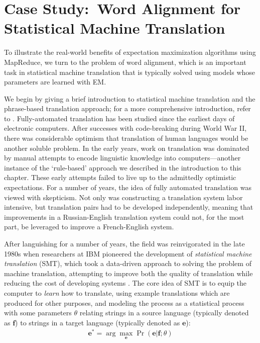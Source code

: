 \section{Case Study:\ Word Alignment for Statistical Machine Translation}
\label{chapter6_word_alignment}

To illustrate the real-world benefits of expectation maximization
algorithms using MapReduce, we turn to the problem of word alignment,
which is an important task in statistical machine translation that is
typically solved using models whose parameters are learned with EM.

We begin by giving a brief introduction to statistical machine
translation and the phrase-based translation approach; for a more
comprehensive introduction, refer to \cite{Koehn_2009,Lopez_2008}.
Fully-automated translation has been studied since the earliest days
of electronic computers.  After successes with code-breaking during
World War II, there was considerable optimism that translation of
human languages would be another soluble problem. In the early years,
work on translation was dominated by manual attempts to encode
linguistic knowledge into computers---another instance of the
`rule-based' approach we described in the introduction to this
chapter.  These early attempts failed to live up to the admittedly
optimistic expectations.  For a number of years, the idea of fully
automated translation was viewed with skepticism.  Not only was
constructing a translation system labor intensive, but translation
pairs had to be developed independently, meaning that improvements in
a Russian-English translation system could not, for the most part, be
leveraged to improve a French-English system.

After languishing for a number of years, the field was reinvigorated
in the late 1980s when researchers at IBM pioneered the development of
\emph{statistical machine translation} (SMT), which took a data-driven
approach to solving the problem of machine translation, attempting to
improve both the quality of translation while reducing the cost of
developing systems \cite{Brown_1993}.  The core idea of SMT is to
equip the computer to \emph{learn} how to translate, using example
translations which are produced for other purposes, and modeling the
process as a statistical process with some parameters $\theta$
relating strings in a source language (typically denoted as
$\textbf{f}$) to strings in a target language (typically denoted as
$\textbf{e}$):
\begin{align}
\textbf{e}^* = \arg \max_{\textbf{e}} \Pr(\textbf{e} | \textbf{f} ; \theta)
\end{align}

